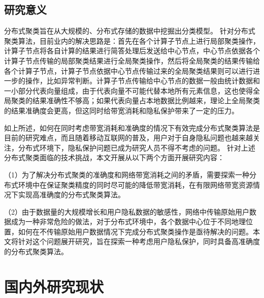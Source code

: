 \subsection{研究意义}
分布式聚类旨在从大规模的、分布式存储的数据中挖掘出分类模型。
针对分布式聚类算法，目前业内的解决思路是：首先在各个计算子节点上进行局部聚类操作，计算子节点将各自计算的结果进行简答处理后发送给中心节点，中心节点依据各个计算子节点传输的局部聚类结果进行全局聚类操作，然后将全局聚类的结果传输给各个计算子节点，计算子节点依据中心节点传输过来的全局聚类结果则可以进行进一步的操作，比如异常判断。计算子节点传输给中心节点的数据一般由统计数据和一小部分代表向量组成，由于代表向量不可能代替本地所有元素信息，这也使得全局聚类的结果准确性不够高；如果代表向量占本地数据比例越来，理论上全局聚类的结果准确度会更高，但这同时给带宽消耗和隐私保护带来了一定的压力。

如上所述，如何在同时考虑带宽消耗和准确度的情况下有效完成分布式聚类算法是目前的研究难点，而且随着移动互联网的普及，用户对于自身隐私问题也越来越关注，分布式环境下，隐私保护问题已成为研究人员不得不考虑的问题。
针对上述分布式聚类面临的技术挑战，本文开展从以下两个方面开展研究内容：

（1）为了解决分布式聚类的准确度和网络带宽消耗之间的矛盾，需要探索一种分布式环境中在保证聚类精度的同时尽可能的降低带宽消耗，在有限网络带宽资源情况下实现高准确度的分布式聚类算法。

（2）由于数据量的大规模增长和用户隐私数据的敏感性，网络中传输原始用户数据成为一种非常危险的做法，对于分布式环境中，各个数据中心位于不同地理位置，如何在不传输原始用户数据情况下完成分布式聚类操作是亟待解决的问题。本文将针对这个问题展开研究，旨在探索一种考虑用户隐私保护，同时具备高准确度的分布式聚类算法。


\section{国内外研究现状}


